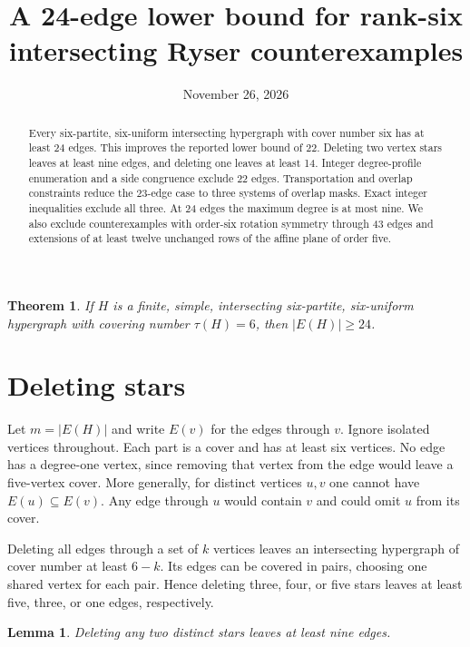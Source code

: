 \documentclass[10pt]{article}
\title{A 24-edge lower bound for rank-six intersecting Ryser counterexamples}
\author{\vspace{-1.5\baselineskip}}
\date{November 26, 2026}
\newtheorem{theorem}{Theorem}
\newtheorem{lemma}{Lemma}
\begin{document}
\maketitle

\begin{abstract}
Every six-partite, six-uniform intersecting hypergraph with cover number six
has at least 24 edges. This improves the reported lower bound of 22.
Deleting two vertex stars leaves at least nine edges, and deleting one
leaves at least 14. Integer degree-profile enumeration and a side congruence
exclude 22 edges. Transportation and overlap constraints reduce the
23-edge case to three systems of overlap masks. Exact integer inequalities
exclude all three. At 24 edges the maximum degree is at most nine.
We also exclude counterexamples with order-six rotation symmetry
through 43 edges and extensions of at least twelve unchanged rows
of the affine plane of order five.
\end{abstract}

\begin{theorem}
If $H$ is a finite, simple, intersecting six-partite, six-uniform hypergraph
with covering number $\tau(H)=6$, then $|E(H)|\geq24$.
\end{theorem}

\section{Deleting stars}

Let $m=|E(H)|$ and write $E(v)$ for the edges through $v$. Ignore isolated
vertices throughout. Each part is a cover and has at least six vertices.
No edge has a degree-one vertex, since removing that vertex from the edge
would leave a five-vertex cover. More generally, for distinct vertices
$u,v$ one cannot have $E(u)\subseteq E(v)$. Any edge through $u$ would
contain $v$ and could omit $u$ from its cover.

Deleting all edges through a set of $k$ vertices leaves an intersecting
hypergraph of cover number at least $6-k$. Its edges can be covered in
pairs, choosing one shared vertex for each pair. Hence deleting three,
four, or five stars leaves at least five, three, or one edges, respectively.

\begin{lemma}
Deleting any two distinct stars leaves at least nine edges.
\end{lemma}
\end{document}
